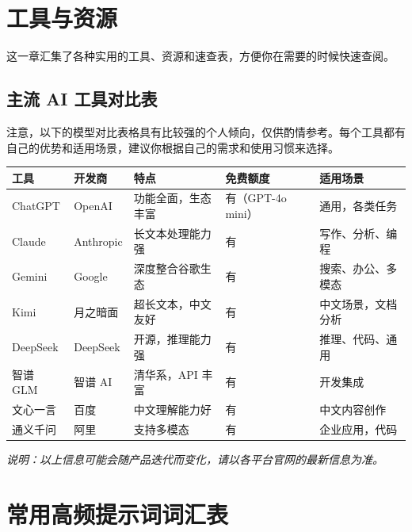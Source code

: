 % 
% 


\chapter{工具与资源}
\label{ch:resources}

这一章汇集了各种实用的工具、资源和速查表，方便你在需要的时候快速查阅。

\section{主流 AI 工具对比表}

注意，以下的模型对比表格具有比较强的个人倾向，仅供酌情参考。每个工具都有自己的优势和适用场景，建议你根据自己的需求和使用习惯来选择。

\begin{center}
\begin{tabular}{p{2.2cm}p{2.5cm}p{2.8cm}p{2cm}p{3cm}}
  \toprule
  \textbf{工具} & \textbf{开发商} & \textbf{特点} & \textbf{免费额度} & \textbf{适用场景} \\
  \midrule
  ChatGPT & OpenAI & 功能全面，生态丰富 & 有（GPT-4o mini） & 通用，各类任务 \\
  Claude & Anthropic & 长文本处理能力强 & 有 & 写作、分析、编程 \\
  Gemini & Google & 深度整合谷歌生态 & 有 & 搜索、办公、多模态 \\
  Kimi & 月之暗面 & 超长文本，中文友好 & 有 & 中文场景，文档分析 \\
  DeepSeek & DeepSeek & 开源，推理能力强 & 有 & 推理、代码、通用 \\
  智谱 GLM & 智谱 AI & 清华系，API 丰富 & 有 & 开发集成 \\
  文心一言 & 百度 & 中文理解能力好 & 有 & 中文内容创作 \\
  通义千问 & 阿里 & 支持多模态 & 有 & 企业应用，代码 \\
  \bottomrule
\end{tabular}
\end{center}

\textit{说明：以上信息可能会随产品迭代而变化，请以各平台官网的最新信息为准。}

\chapter{常用高频提示词词汇表}
\label{ch:common-prompts}

